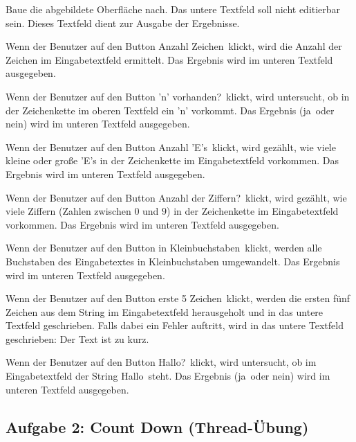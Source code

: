 \begin{compactenum}[a)]
\item Baue die abgebildete Oberfläche nach. Das untere Textfeld soll nicht
editierbar sein. Dieses Textfeld dient zur Ausgabe der Ergebnisse.

\item Wenn der Benutzer auf den Button \glqq Anzahl Zeichen\grqq\ klickt, wird
die Anzahl der Zeichen im Eingabetextfeld ermittelt. Das Ergebnis wird im
unteren Textfeld ausgegeben.

\item Wenn der Benutzer auf den Button \glqq 'n' vorhanden?\grqq\ klickt, wird
untersucht, ob in der Zeichenkette im oberen Textfeld ein 'n' vorkommt. Das
Ergebnis (\glqq ja\grqq\ oder \glqq nein\grqq ) wird im unteren Textfeld
ausgegeben.

\item Wenn der Benutzer auf den Button \glqq Anzahl 'E's\grqq\ klickt, wird
gezählt, wie viele kleine oder große 'E's in der Zeichenkette im Eingabetextfeld
vorkommen. Das Ergebnis wird im unteren Textfeld ausgegeben.

\item Wenn der Benutzer auf den Button \glqq Anzahl der Ziffern?\grqq\ klickt,
wird gezählt, wie viele Ziffern (Zahlen zwischen $0$ und $9$) in der Zeichenkette
im Eingabetextfeld vorkommen. Das Ergebnis wird im unteren Textfeld ausgegeben.

\item Wenn der Benutzer auf den Button \glqq in Kleinbuchstaben\grqq\ klickt,
werden alle Buchstaben des Eingabetextes in Kleinbuchstaben umgewandelt. Das
Ergebnis wird im unteren Textfeld ausgegeben.

\item Wenn der Benutzer auf den Button \glqq erste 5 Zeichen\grqq\ klickt,
werden die ersten fünf Zeichen aus dem String im Eingabetextfeld herausgeholt
und in das untere Textfeld geschrieben. Falls dabei ein Fehler auftritt, wird in
das untere Textfeld geschrieben: \glqq Der Text ist zu kurz.\grqq

\item Wenn der Benutzer auf den Button \glqq Hallo?\grqq\ klickt, wird
untersucht, ob im Eingabetextfeld der String \glqq Hallo\grqq\ steht. Das
Ergebnis (\glqq ja\grqq\ oder \glqq nein\grqq ) wird im unteren Textfeld
ausgegeben.
\end{compactenum}


\subsection{Aufgabe 2: Count Down (Thread-Übung)}

